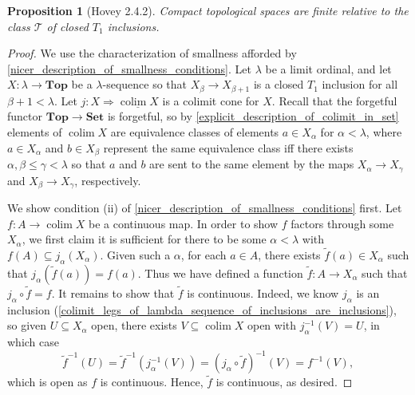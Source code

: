 \documentclass{amsart}
\theoremstyle{plain}
\newtheorem{proposition}[theorem]{Proposition}
\theoremstyle{definition}
\newcommand{\Top}{\mbf{Top}}
\newcommand{\Set}{\mbf{Set}}
\newcommand{\sseq}{\subseteq}
\newcommand{\wt}{\widetilde}
\newcommand{\0}{\mathbf{0}}
\newcommand{\cT}{\mathcal T}
\newcommand{\mbf}[1]{\mathbf{#1}}
\newcommand{\ul}{\underline}
\renewcommand{\(}{\left(}
\renewcommand{\)}{\right)}
\DeclareMathOperator*{\colim}{colim}
\begin{document}
\begin{proposition}[Hovey 2.4.2]\label{2.4.2}
  Compact topological spaces are finite relative to the class $\cT$ of closed $T_1$ inclusions.
\end{proposition}
\begin{proof}
  We use the characterization of smallness afforded by \autoref{nicer_description_of_smallness_conditions}. Let $\lambda$ be a limit ordinal, and let $X:\lambda\to\Top$ be a $\lambda$-sequence so that $X_\beta\to X_{\beta+1}$ is a closed $T_1$ inclusion for all $\beta+1<\lambda$. Let $j:X\Rightarrow\ul{\colim X}$ is a colimit cone for $X$. Recall that the forgetful functor $\Top\to\Set$ is forgetful, so by \autoref{explicit_description_of_colimit_in_set} elements of $\colim X$ are equivalence classes of elements $a\in X_\alpha$ for $\alpha<\lambda$, where $a\in X_\alpha$ and $b\in X_\beta$ represent the same equivalence class iff there exists $\alpha,\beta\leq\gamma<\lambda$ so that $a$ and $b$ are sent to the same element by the maps $X_\alpha\to X_\gamma$ and $X_\beta\to X_\gamma$, respectively.

  We show condition (ii) of \autoref{nicer_description_of_smallness_conditions} first. Let $f:A\to\colim X$ be a continuous map. In order to show $f$ factors through some $X_\alpha$, we first claim it is sufficient for there to be some $\alpha<\lambda$ with $f(A)\sseq j_\alpha(X_\alpha)$. Given such a $\alpha$, for each $a\in A$, there exists $\wt f(a)\in X_\alpha$ such that $j_\alpha(\wt f(a))=f(a)$. Thus we have defined a function $\wt f:A\to X_\alpha$ such that $j_\alpha\circ\wt f=f$. It remains to show that $\wt f$ is continuous. Indeed, we know $j_\alpha$ is an inclusion (\autoref{colimit_legs_of_lambda_sequence_of_inclusions_are_inclusions}), so given $U\sseq X_\alpha$ open, there exists $V\sseq\colim X$ open with $j_\alpha^{-1}(V)=U$, in which case
  \[\wt f^{-1}(U)=\wt f^{-1}(j_\alpha^{-1}(V))=(j_\alpha\circ\wt f)^{-1}(V)=f^{-1}(V),\]
  which is open as $f$ is continuous. Hence, $\wt f$ is continuous, as desired.


\end{proof}
\end{document}
